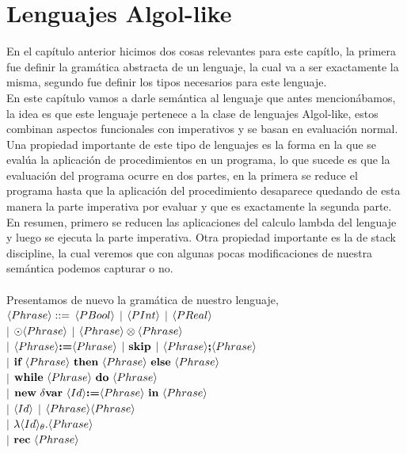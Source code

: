 \chapter{Lenguajes Algol-like}
\label{chap:algollike}

En el cap\'itulo anterior hicimos dos cosas relevantes 
para este cap\'itlo, la primera fue definir la gram\'atica
abstracta de un lenguaje, la cual va a ser exactamente la
misma, segundo fue definir los tipos necesarios para este 
lenguaje. \\

En este cap\'itulo vamos a darle sem\'antica al lenguaje
que antes mencion\'abamos, la idea es que este lenguaje 
pertenece a la clase de lenguajes Algol-like, estos combinan
aspectos funcionales con imperativos y se basan en evaluaci\'on
normal. Una propiedad importante de este tipo de lenguajes es
la forma en la que se eval\'ua la aplicaci\'on de procedimientos
en un programa, lo que sucede es que la evaluaci\'on del programa
ocurre en dos partes, en la primera se reduce el programa hasta que
la aplicaci\'on del procedimiento desaparece quedando de esta manera 
la parte imperativa por evaluar y que es exactamente la segunda parte.
En resumen, primero se reducen las aplicaciones del calculo lambda
del lenguaje y luego se ejecuta la parte imperativa. Otra propiedad 
importante es la de stack discipline, la cual veremos que con 
algunas pocas modificaciones de nuestra sem\'antica podemos capturar
o no.\\

\noindent
{}\\

Presentamos de nuevo la gram\'atica de nuestro lenguaje,\\

\noindent
$\langle Phrase \rangle ::=$ $\langle PBool \rangle$ $|$ $\langle PInt \rangle$ $|$ $\langle PReal \rangle$ \\
\indent \indent \indent $|$ 
$\odot \langle Phrase \rangle$ $|$ $\langle Phrase \rangle \otimes \langle Phrase \rangle $ \\ 
\indent \indent \indent $|$ 
$\langle Phrase \rangle \textbf{:=} \langle Phrase \rangle$ $|$ $\textbf{skip}$ $|$ $\langle Phrase \rangle \textbf{;} \langle Phrase \rangle$ \\ 
\indent \indent \indent $|$ 
$\textbf{if} \ \langle Phrase \rangle \ \textbf{then} \ \langle Phrase \rangle \ \textbf{else} \ \langle Phrase \rangle$ \\ 
\indent \indent \indent $|$ 
$\textbf{while} \ \langle Phrase \rangle \ \textbf{do} \ \langle Phrase \rangle$ \\ 
\indent \indent \indent $|$ 
$\textbf{new} \ \delta \textbf{var} \ \langle Id \rangle \textbf{:=} \langle Phrase \rangle \ \textbf{in} \ \langle Phrase \rangle$ \\ 
\indent \indent \indent $|$ 
$\langle Id \rangle$ $|$ $\langle Phrase \rangle\langle Phrase \rangle$ \\
\indent \indent \indent $|$ 
$\lambda \langle Id \rangle_{\theta} . \langle Phrase \rangle $ \\
\indent \indent \indent $|$ 
$\textbf{rec} \ \langle Phrase \rangle$
\\

